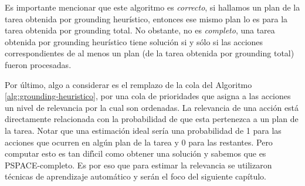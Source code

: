 Es importante mencionar que este algoritmo es \emph{correcto}, si hallamos un
plan de la tarea obtenida por grounding heurístico, entonces ese mismo plan lo
es para la tarea obtenida por grounding total. No obstante, no es
\emph{completo}, una tarea obtenida por grounding heurístico tiene solución si y
sólo si las acciones correspondientes de al menos un plan (de la tarea obtenida
por grounding total) fueron procesadas.

Por último, algo a considerar es el remplazo de la cola del Algoritmo
\ref{alg:grounding-heuristico}, por una cola de prioridades que asigna a las
acciones un nivel de relevancia por la cual son ordenadas. La relevancia de una
acción está directamente relacionada con la probabilidad de que esta pertenezca
a un plan de la tarea. Notar que una estimación ideal sería una probabilidad de
1 para las acciones que ocurren en algún plan de la tarea y 0 para las
restantes. Pero computar esto es tan difı́cil como obtener una solución
y sabemos que es PSPACE-completo. Es por eso que para estimar la relevancia se
utilizaron técnicas de aprendizaje automático y serán el foco del siguiente
capítulo.
